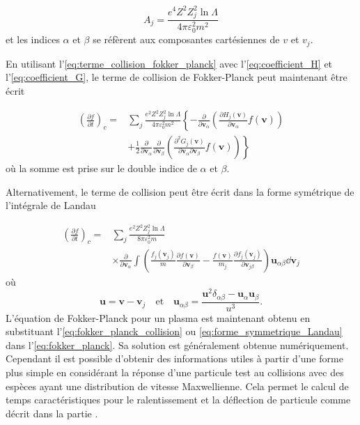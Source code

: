 \documentclass[main.tex]{subfiles}
\begin{document}
\[
	A_j = \frac{e^4 Z^2 Z^2_j \ln \Lambda}{4 \pi \varepsilon_0^2 m^2}
\]
et les indices \( \alpha \) et \( \beta \) se réfèrent aux composantes cartésiennes de \( v \) et \( v_j \).

En utilisant l'\autoref{eq:terme_collision_fokker_planck} avec l'\autoref{eq:coefficient_H} et l'\autoref{eq:coefficient_G}, le terme de collision de Fokker-Planck peut maintenant être écrit

\begin{align}
	\left( \frac{\partial f}{\partial t} \right)_c =& \sum_j \frac{e^2 Z^2 Z^2_j \ln \Lambda}{4 \pi \varepsilon_0^2 m^2} \left\lbrace - \frac{\partial}{\partial \bm{v}_\alpha} \left( \frac{\partial H_j \left(\bm{v}\right)}{\partial \bm{v}_\alpha} f\left(\bm{v}\right)\right)\right.\nonumber\\
	& \left.+ \frac{1}{2} \frac{\partial}{\partial \bm{v}_\alpha} \frac{\partial}{\partial \bm{v}_\beta} \left( \frac{\partial^2 G_j \left(\bm{v} \right)}{\partial \bm{v}_\alpha \partial \bm{v}_\beta} f\left(\bm{v}\right) \right) \right\rbrace
	\label{eq:fokker_planck_collision}
\end{align}
où la somme est prise sur le double indice de \( \alpha \) et \( \beta \).

Alternativement, le terme de collision peut être écrit dans la forme symétrique de l'intégrale de Landau

\begin{align}
	\left( \frac{\partial f}{\partial t} \right)_c = &\sum_j \frac{e^2 Z^2 Z^2_j \ln \Lambda}{8 \pi \varepsilon_0^2 m} \nonumber\\
	& \times \frac{\partial}{\partial \bm{v}_\alpha} \int \left( \frac{f_j \left( \bm{v}_j \right)}{m} \frac{\partial f \left( \bm{v} \right)}{\partial \bm{v}_\beta} - \frac{f \left( \bm{v} \right)}{m_j} \frac{\partial f_j \left( \bm{v}_j \right)}{\partial \bm{v}_{j\beta}} \right) \bm{u}_{\alpha\beta} \dd \bm{v}_j
	\label{eq:forme_symmetrique_Landau}
\end{align}
où
\[
	\bm{u} = \bm{v} - \bm{v}_j \quad \text{et} \quad \bm{u}_{\alpha \beta} = \frac{\bm{u}^2 \delta_{\alpha \beta} - \bm{u}_\alpha \bm{u}_\beta}{u^3}.
\]
L'équation de Fokker-Planck pour un plasma est maintenant obtenu en substituant l'\autoref{eq:fokker_planck_collision} ou \ref{eq:forme_symmetrique_Landau} dans l'\autoref{eq:fokker_planck}.
Sa solution est généralement obtenue numériquement.
Cependant il est possible d'obtenir des informations utiles à partir d'une forme plus simple en considérant la réponse d'une particule test au collisions avec des espèces ayant une distribution de vitesse Maxwellienne.
Cela permet le calcul de temps caractéristiques pour le ralentissement et la déflection de particule comme décrit dans la partie \color{red}{ 2.14 (lien à rajouter quand elle sera faite)}\color{black}.
\end{document}
